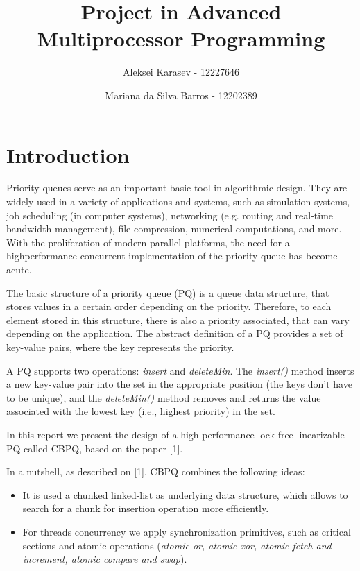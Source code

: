 \documentclass{article}
\begin{document}
\title{Project in Advanced Multiprocessor Programming}
\author[1]{Aleksei Karasev - 12227646}
\author[2]{Mariana da Silva Barros - 12202389}
\maketitle

\section{Introduction}
Priority queues serve as an important basic tool in algorithmic design.
They are widely used in a variety of applications and systems, such as simulation systems, job scheduling (in computer systems), networking (e.g. routing and real-time bandwidth management), file compression, numerical computations, and more. With the proliferation of modern parallel platforms, the need for a highperformance concurrent implementation of the priority queue has become acute.\par

The basic structure of a priority queue (PQ) is a queue data structure, that stores values in a certain order depending on the priority. Therefore, to each element stored in this structure, there is also a priority associated, that can vary depending on the application. The abstract definition of a PQ provides a set of key-value pairs, where the key represents the priority.\par

A PQ supports two operations: \textit{insert} and \textit{deleteMin}. The \textit{insert()} method inserts a new key-value pair into the set in the appropriate position (the keys don’t have to be unique), and the \textit{deleteMin()} method removes and returns the value associated with the lowest key (i.e., highest priority) in the set.\par

In this report we present the design of a high performance lock-free linearizable PQ called CBPQ, based on the paper [1].\par
In a nutshell, as described on [1], CBPQ combines the following ideas:

\begin{itemize}
  \item It is used a chunked linked-list as underlying data structure, which allows to search for a chunk for insertion operation more efficiently.
  \item For threads concurrency we apply synchronization primitives, such as critical sections and atomic operations (\textit{atomic or, atomic xor, atomic fetch and increment, atomic compare and swap}).
\end{itemize}
\end{document}
